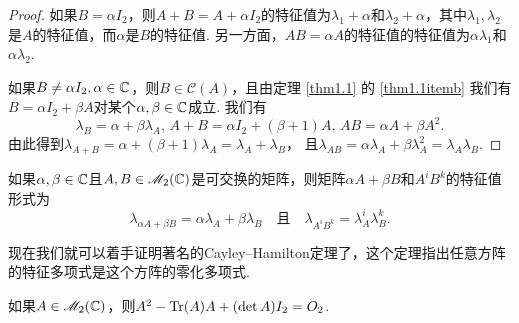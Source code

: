 \begin{proof}
  如果$B=\alpha I_2$，则$A+B=A+\alpha I_2$的特征值为$\lambda_1+\alpha$和$\lambda_2+\alpha$，其中$\lambda_1,\lambda_2$是$A$的特征值，而$\alpha$是$B$的特征值. 另一方面，$AB=\alpha A$的特征值的特征值为$\alpha\lambda_1$和$\alpha\lambda_2$.

  如果$B\ne\alpha I_2,\alpha\in\mathbb C$，则$B\in\mathscr C (A)$，且由定理 \ref{thm1.1} 的 \ref{thm1.1itemb} 我们有$B=\alpha I_2+\beta A$对某个$\alpha,\beta\in\mathbb C$成立. 我们有
  \[
    \lambda_B = \alpha + \beta\lambda_A,\,
    A + B = \alpha I_2 + (\beta+1)A,\,
    AB = \alpha A + \beta A^2.
  \]
  由此得到$\lambda_{A+B}=\alpha+(\beta+1)\lambda_A=\lambda_A+\lambda_B$，
  且$\lambda_{AB}=\alpha\lambda_A+\beta\lambda_A^2
  =\lambda_A\lambda_B $.
\end{proof}

\begin{remark}
  如果$\alpha,\beta\in\mathbb C$且$A,B\in\mathscr M_2(\mathbb C)$是可交换的矩阵，则矩阵$\alpha A+\beta B$和$A^iB^k$的特征值形式为
  \[
    \lambda_{\alpha A+\beta B} = \alpha\lambda_A + \beta\lambda_B\quad \text{且}\quad \lambda_{A^iB^k}=\lambda_A^i\lambda_B^k.
  \]
\end{remark}

现在我们就可以着手证明著名的Cayley--Hamilton定理了，这个定理指出{\kaishu 任意方阵的特征多项式是这个方阵的零化多项式}.

\begin{mybox}
  \begin{theorem}

    如果$A\in\mathscr M_2(\mathbb C)$，则$A^2-\operatorname{Tr}(A)A+(\det A)I_2=O_2$.
  \end{theorem}
\end{mybox}

